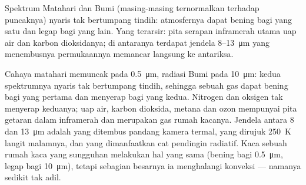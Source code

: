 \begin{omfigure}

{\small Spektrum Matahari dan Bumi (masing-masing ternormalkan terhadap
puncaknya) nyaris tak bertumpang tindih: atmosfernya dapat bening bagi yang satu dan
legap bagi yang lain. Yang terarsir: pita serapan inframerah utama
uap air dan karbon dioksidanya; di antaranya terdapat jendela
\qty{8}{}--\qty{13}{\micro m} yang menembusnya permukaannya memancar langsung ke antariksa.}
\end{omfigure}

\begin{remark}\label{rem:b2:thermal-radiation:selective}
Cahaya matahari memuncak pada \qty{0.5}{\micro m}, radiasi Bumi pada
\qty{10}{\micro m}: kedua spektrumnya nyaris tak bertumpang tindih, sehingga sebuah gas dapat
bening bagi yang pertama dan menyerap bagi yang kedua. Nitrogen dan
oksigen tak menyerap keduanya; uap air, karbon dioksida, metana dan ozon
mempunyai pita getaran dalam inframerah dan merupakan gas rumah kacanya.
Jendela antara \qty{8}{} dan \qty{13}{\micro m} adalah yang ditembus pandang kamera termal,
yang dirujuk \qty{250}{K} langit malamnya, dan yang
dimanfaatkan cat pendingin radiatif. Kaca sebuah rumah kaca yang sungguhan melakukan
hal yang sama (bening bagi \qty{0.5}{\micro m}, legap bagi \qty{10}{\micro m}),
tetapi sebagian besarnya ia menghalangi konveksi --- namanya sedikit tak adil.
\end{remark}

